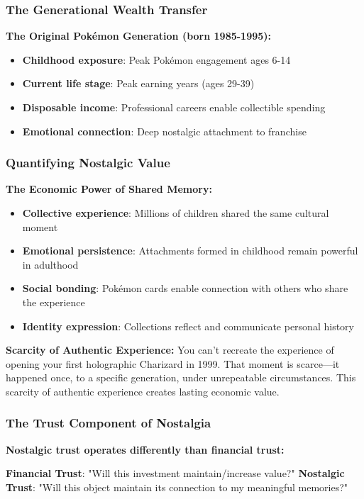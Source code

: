 \documentclass[11pt,oneside]{book}
\begin{document}
{{{{{{\subsubsection{The Generational Wealth Transfer}

\textbf{The Original Pokémon Generation (born 1985-1995):}
\begin{itemize}
\item \textbf{Childhood exposure}: Peak Pokémon engagement ages 6-14
\item \textbf{Current life stage}: Peak earning years (ages 29-39)
\item \textbf{Disposable income}: Professional careers enable collectible spending
\item \textbf{Emotional connection}: Deep nostalgic attachment to franchise
\end{itemize}

\subsubsection{Quantifying Nostalgic Value}

\textbf{The Economic Power of Shared Memory:}
\begin{itemize}
\item \textbf{Collective experience}: Millions of children shared the same cultural moment
\item \textbf{Emotional persistence}: Attachments formed in childhood remain powerful in adulthood
\item \textbf{Social bonding}: Pokémon cards enable connection with others who share the experience
\item \textbf{Identity expression}: Collections reflect and communicate personal history
\end{itemize}

\textbf{Scarcity of Authentic Experience:}
You can't recreate the experience of opening your first holographic Charizard in 1999. That moment is scarce—it happened once, to a specific generation, under unrepeatable circumstances. This scarcity of authentic experience creates lasting economic value.

\subsubsection{The Trust Component of Nostalgia}

\textbf{Nostalgic trust operates differently than financial trust:}

\textbf{Financial Trust}: "Will this investment maintain/increase value?"
\textbf{Nostalgic Trust}: "Will this object maintain its connection to my meaningful memories?"

}}}}}}
\end{document}
